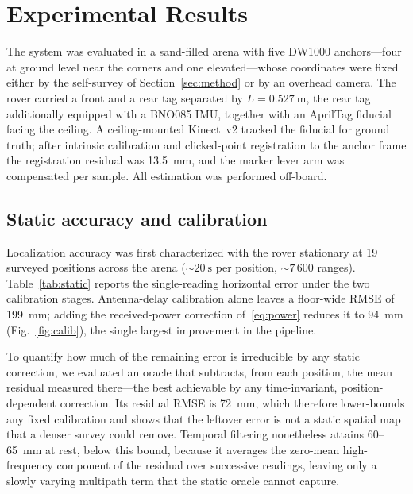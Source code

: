 \section{Experimental Results}
\label{sec:results}

The system was evaluated in a sand-filled arena with five DW1000
anchors---four at ground level near the corners and one elevated---whose
coordinates were fixed either by the self-survey of
Section~\ref{sec:method} or by an overhead camera. The rover carried a
front and a rear tag separated by $L=\SI{0.527}{\meter}$, the rear tag
additionally equipped with a BNO085 IMU, together with an AprilTag
fiducial facing the ceiling. A ceiling-mounted Kinect~v2 tracked the
fiducial for ground truth; after intrinsic calibration and clicked-point
registration to the anchor frame the registration residual was
\SI{13.5}{\milli\meter}, and the marker lever arm was compensated per
sample. All estimation was performed off-board.

\subsection{Static accuracy and calibration}
Localization accuracy was first characterized with the rover stationary
at 19 surveyed positions across the arena ($\sim\!\SI{20}{\second}$ per
position, $\sim\!7\,600$ ranges). Table~\ref{tab:static} reports the
single-reading horizontal error under the two calibration stages.
Antenna-delay calibration alone leaves a floor-wide RMSE of
\SI{199}{\milli\meter}; adding the received-power correction
of~\eqref{eq:power} reduces it to \SI{94}{\milli\meter}
(Fig.~\ref{fig:calib}), the single largest improvement in the pipeline.

To quantify how much of the remaining error is irreducible by any static
correction, we evaluated an oracle that subtracts, from each position,
the mean residual measured there---the best achievable by any
time-invariant, position-dependent correction. Its residual RMSE is
\SI{72}{\milli\meter}, which therefore lower-bounds any fixed calibration
and shows that the leftover error is not a static spatial map that a
denser survey could remove. Temporal filtering nonetheless attains
\SI{60}{}--\SI{65}{\milli\meter} at rest, below this bound, because it
averages the zero-mean high-frequency component of the residual over
successive readings, leaving only a slowly varying multipath term that
the static oracle cannot capture.

